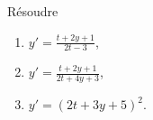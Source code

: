 

\begin{exercice}\label{exo_II-1-13}

Résoudre
\begin{enumerate}
\item\label{ItemII113a} $y'=\frac{ t+2y+1 }{ 2t-3 }$,
\item\label{ItemII113b} $y'=\frac{ t+2y+1 }{ 2t+4y+3 }$,
\item $y'=(2t+3y+5)^2$.
\end{enumerate}

\end{exercice}
